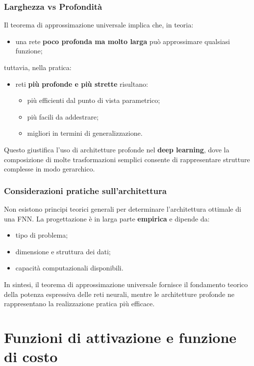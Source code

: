 \documentclass[a4paper,12pt]{report}
\begin{document}
\subsubsection{Larghezza vs Profondità}

Il teorema di approssimazione universale implica che, in teoria:
\begin{itemize}
    \item una rete \textbf{poco profonda ma molto larga} può approssimare qualsiasi funzione;
\end{itemize}
tuttavia, nella pratica:
\begin{itemize}
    \item reti \textbf{più profonde e più strette} risultano:
    \begin{itemize}
        \item più efficienti dal punto di vista parametrico;
        \item più facili da addestrare;
        \item migliori in termini di generalizzazione.
    \end{itemize}
\end{itemize}

Questo giustifica l’uso di architetture profonde nel \textbf{deep learning}, dove la composizione di molte trasformazioni semplici consente di rappresentare strutture complesse in modo gerarchico.

\subsubsection{Considerazioni pratiche sull’architettura}

Non esistono principi teorici generali per determinare l’architettura ottimale di una FNN.  
La progettazione è in larga parte \textbf{empirica} e dipende da:
\begin{itemize}
    \item tipo di problema;
    \item dimensione e struttura dei dati;
    \item capacità computazionali disponibili.
\end{itemize}

In sintesi, il teorema di approssimazione universale fornisce il fondamento teorico della potenza espressiva delle reti neurali, mentre le architetture profonde ne rappresentano la realizzazione pratica più efficace.

\section{Funzioni di attivazione e funzione di costo}
\end{document}
